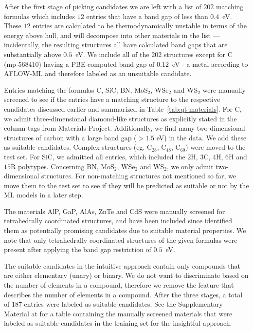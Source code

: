 \documentclass[superscriptaddress,unsortedaddress,
 amsmath,amssymb,
 aps,
]{revtex4-2}
\begin{document}
After the first stage of picking candidates we are left with a list of $202$ matching formulas which includes $12$ entries that have a band gap of less than $0.4$~eV. These $12$ entries are calculated to be thermodynamically unstable in terms of the energy above hull, and will decompose into other materials in the list --- incidentally, the resulting structures all have calculated band gaps that are substantially above $0.5$~eV. We include all of the $202$ structures except for C (mp-568410) having a PBE-computed band gap of $0.12$~eV - a metal according to AFLOW-ML and therefore labeled as an unsuitable candidate. 
 
Entries matching the formulas C, SiC, BN, MoS$_2$, WSe$_2$ and WS$_2$ were manually screened to see if the entries have a matching structure to the respective candidates discussed earlier and summarized in Table~\ref{tab:qt-materials}. 
For C, we admit three-dimensional diamond-like structures as explicitly stated in the column tags from Materials Project. Additionally, we find many two-dimensional structures of carbon with a large band gap ($>1.5$ eV) in the data. We add these as suitable candidates. Complex structures (eg. C$_{28}$, C$_{48}$, C$_{60}$) were moved to the test set. For SiC, we admitted all entries, which included the $2$H, $3$C, $4$H, $6$H and $15$R polytypes. Concerning BN, MoS$_2$, WSe$_2$ and  WS$_2$, we only admit two-dimensional structures. For non-matching structures not mentioned so far, we move them to the test set to see if they will be predicted as suitable or not by the ML models in a later step.

The materials AlP, GaP, AlAs, ZnTe and CdS were manually screened for tetrahedrally coordinated structures, and have been included since \citeauthor{Weber2010} \cite{Weber2010}  identified them as potentially promising candidates due to suitable material properties. 
We note that only tetrahedrally coordinated structures of the given formulas were present after applying the band gap restriction of $0.5$~eV.

The suitable candidates in the intuitive approach contain only compounds that are either elementary (unary) or binary. We do not want to discriminate based on the number of elements in a compound, therefore we remove the feature that describes the number of elements in a compound. After the three stages, a total of $187$ entries were labeled as suitable candidates.
See the Supplementary Material at \cite{supplementary} for a table containing the manually screened materials that were labeled as suitable candidates in the training set for the insightful approach. 
\end{document}
